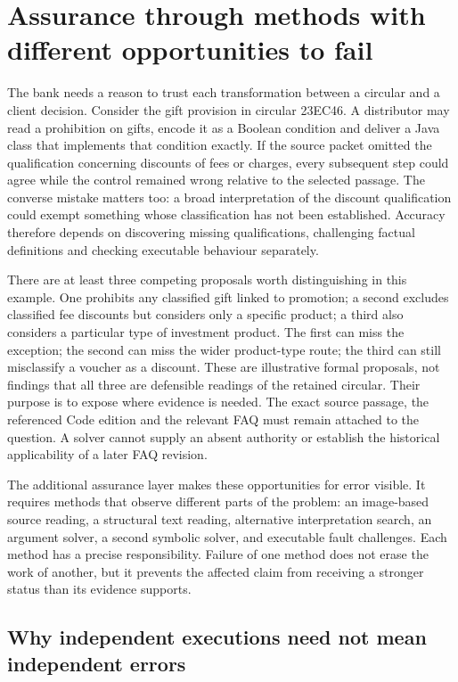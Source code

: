 \section{Assurance through methods with different opportunities to fail}
\label{sec:diverse-assurance-round11}

The bank needs a reason to trust each transformation between a circular and a
client decision. Consider the gift provision in circular 23EC46. A distributor
may read a prohibition on gifts, encode it as a Boolean condition and deliver a
Java class that implements that condition exactly. If the source packet omitted
the qualification concerning discounts of fees or charges, every subsequent
step could agree while the control remained wrong relative to the selected
passage. The converse mistake matters too: a broad interpretation of the
discount qualification could exempt something whose classification has not been
established. Accuracy therefore depends on discovering missing qualifications,
challenging factual definitions and checking executable behaviour separately.

There are at least three competing proposals worth distinguishing in this
example. One prohibits any classified gift linked to promotion; a second excludes
classified fee discounts but considers only a specific product; a third also
considers a particular type of investment product. The first can miss the
exception; the second can miss the wider product-type route; the third can still
misclassify a voucher as a discount. These are illustrative formal proposals,
not findings that all three are defensible readings of the retained circular.
Their purpose is to expose where evidence is needed. The exact source passage,
the referenced Code edition and the relevant FAQ must remain attached to the
question. A solver cannot supply an absent authority or establish the historical
applicability of a later FAQ revision.

The additional assurance layer makes these opportunities for error visible. It
requires methods that observe different parts of the problem: an image-based
source reading, a structural text reading, alternative interpretation search,
an argument solver, a second symbolic solver, and executable fault challenges.
Each method has a precise responsibility. Failure of one method does not erase
the work of another, but it prevents the affected claim from receiving a stronger
status than its evidence supports.

\subsection{Why independent executions need not mean independent errors}

